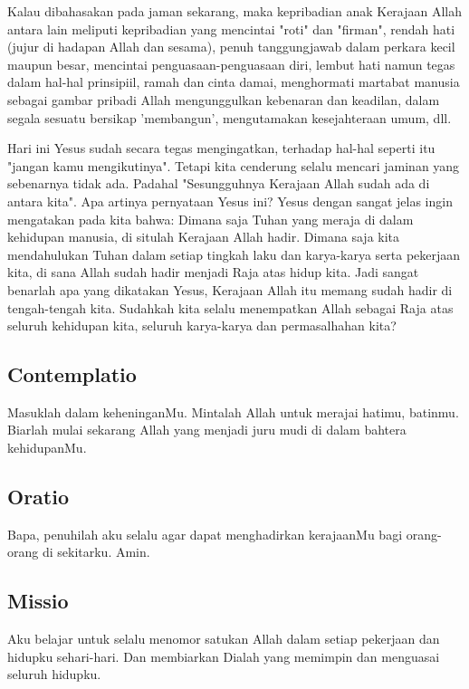 \documentclass[a5paper,headsepline,titlepage,11pt,nnormalheadings,DIVcalc]{scrbook}
\begin{document}
Kalau dibahasakan pada jaman sekarang, maka kepribadian anak  Kerajaan  Allah  antara   lain   meliputi  kepribadian yang mencintai "roti" dan "firman", rendah hati (jujur di hadapan Allah dan sesama), penuh tanggungjawab dalam perkara kecil maupun besar,   mencintai   penguasaan-penguasaan   diri,   lembut   hati namun tegas dalam hal-hal prinsipiil, ramah dan cinta damai, menghormati martabat manusia sebagai gambar pribadi Allah mengunggulkan kebenaran dan keadilan, dalam segala sesuatu bersikap 'membangun', mengutamakan  kesejahteraan umum, dll.

       Hari ini Yesus sudah secara tegas mengingatkan, terhadap hal-hal
seperti itu "jangan kamu mengikutinya". Tetapi kita cenderung selalu mencari
jaminan yang sebenarnya tidak ada. Padahal "Sesungguhnya Kerajaan Allah
sudah ada di antara kita". Apa artinya pernyataan Yesus ini? Yesus dengan
sangat jelas ingin mengatakan pada kita bahwa: Dimana saja Tuhan yang meraja
di dalam kehidupan manusia, di situlah Kerajaan Allah hadir. Dimana saja
kita mendahulukan Tuhan dalam setiap tingkah laku dan karya-karya serta
pekerjaan kita, di sana Allah sudah hadir menjadi Raja atas hidup kita. Jadi
sangat benarlah apa yang dikatakan Yesus, Kerajaan Allah itu memang sudah
hadir di tengah-tengah kita. Sudahkah kita selalu menempatkan Allah sebagai
Raja atas seluruh kehidupan kita, seluruh karya-karya dan permasalhahan kita?

\subsection*{Contemplatio}
Masuklah dalam keheninganMu. Mintalah Allah untuk merajai hatimu, batinmu.
Biarlah mulai sekarang Allah yang menjadi juru mudi di dalam bahtera
kehidupanMu.

\subsection*{Oratio}
Bapa, penuhilah aku selalu agar dapat menghadirkan kerajaanMu bagi
orang-orang di sekitarku. Amin.

\subsection*{Missio}
Aku belajar untuk selalu menomor satukan Allah dalam setiap pekerjaan dan
hidupku sehari-hari. Dan membiarkan Dialah yang memimpin dan menguasai
seluruh hidupku.
\end{document}
